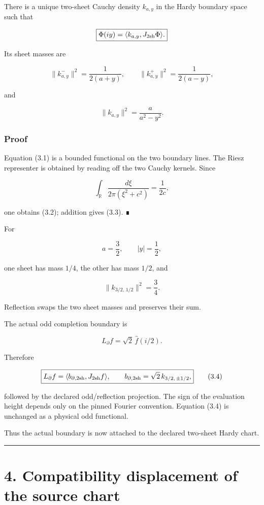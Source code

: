 There is a unique two-sheet Cauchy density \(k_{a,y}\) in the Hardy boundary
space such that

\[
\boxed{
\Phi(iy)=\langle k_{a,y},J_{\rm 2sh}\Phi\rangle.
}
\]

Its sheet masses are

\[
\boxed{
\|k_{a,y}^-\|^2
=\frac{1}{2(a+y)},
\qquad
\|k_{a,y}^+\|^2
=\frac{1}{2(a-y)},
}
\tag{3.2}
\]

and

\[
\boxed{
\|k_{a,y}\|^2
=\frac{a}{a^2-y^2}.
}
\tag{3.3}
\]

\hypertarget{proof}{%
\subsubsection{Proof}\label{proof}}

Equation (3.1) is a bounded functional on the two boundary lines. The Riesz
representer is obtained by reading off the two Cauchy kernels. Since

\[
\int_{\mathbb R}\frac{d\xi}{2\pi(\xi^2+c^2)}
=\frac1{2c},
\]

one obtains (3.2); addition gives (3.3). ∎

For

\[
a=\frac32,
\qquad
|y|=\frac12,
\]

one sheet has mass \(1/4\), the other has mass \(1/2\), and

\[
\boxed{
\|k_{3/2,\,1/2}\|^2=\frac34.
}
\]

Reflection swaps the two sheet masses and preserves their sum.

The actual odd completion boundary is

\[
L_\partial f=\sqrt2\,\widehat f(i/2).
\]

Therefore

\[
\boxed{
L_\partial f
=
\langle b_{\partial,{\rm 2sh}},J_{\rm 2sh}f\rangle,
\qquad
b_{\partial,{\rm 2sh}}
=\sqrt2\,k_{3/2,\,\pm1/2},
}
\tag{3.4}
\]

followed by the declared odd/reflection projection. The sign of the evaluation
height depends only on the pinned Fourier convention. Equation (3.4) is
unchanged as a physical odd functional.

Thus the actual boundary is now attached to the declared two-sheet Hardy chart.

\begin{center}\rule{0.5\linewidth}{0.5pt}\end{center}

\hypertarget{compatibility-displacement-of-the-source-chart}{%
\section{4. Compatibility displacement of the source chart}\label{compatibility-displacement-of-the-source-chart}}

